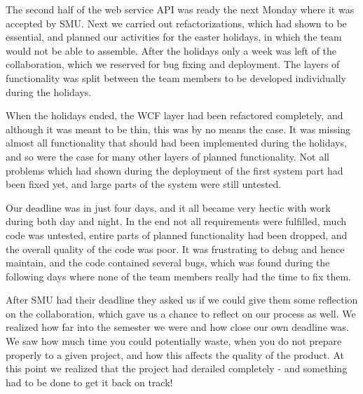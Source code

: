 The second half of the web service API was ready the next Monday where it was accepted by SMU. Next we carried out refactorizations, which had shown to be essential, and planned our activities for the easter holidays, in which the team would not be able to assemble. After the holidays only a week was left of the collaboration, which we reserved for bug fixing and deployment. The layers of functionality was split between the team members to be developed individually during the holidays.

When the holidays ended, the WCF layer had been refactored completely, and although it was meant to be thin, this was by no means the case. It was missing almost all functionality that should had been implemented during the holidays, and so were the case for many other layers of planned functionality.
Not all problems which had shown during the deployment of the first system part had been fixed yet, and large parts of the system were still untested.

Our deadline was in just four days, and it all became very hectic with work during both day and night. In the end not all requirements were fulfilled, much code was untested, entire parts of planned functionality had been dropped, and the overall quality of the code was poor. It was frustrating to debug and hence maintain, and the code contained several bugs, which was found during the following days where none of the team members really had the time to fix them.

After SMU had their deadline they asked us if we could give them some reflection on the collaboration, which gave us a chance to reflect on our process as well. We realized how far into the semester we were and how close our own deadline was. We saw how much time you could potentially waste, when you do not prepare properly to a given project, and how this affects the quality of the product. At this point we realized that the project had derailed completely - and something had to be done to get it back on track!
\newpage